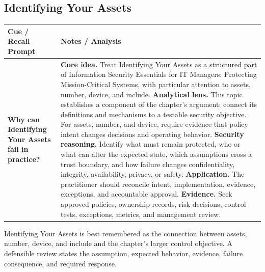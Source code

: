 \documentclass[11pt]{article}
\newcommand{\CornellHeader}{%
\rowcolor{Navy}\color{white}\bfseries Cue / Recall Prompt & \color{white}\bfseries Notes / Analysis\\\hline}
\newcommand{\CornellRow}[2]{%
\cellcolor{CueGray}\RaggedRight\textbf{#1} & \RaggedRight #2\\\hline}
\begin{document}
\subsection*{Identifying Your Assets}
\begin{longtable}{>{\RaggedRight\arraybackslash}p{}|>{\RaggedRight\arraybackslash}p{}}
\CornellHeader
\CornellRow{Why can Identifying Your Assets fail in practice?}{\textbf{Core idea.} Treat Identifying Your Assets as a structured part of Information Security Essentials for IT Managers: Protecting Mission-Critical Systems, with particular attention to assets, number, device, and include. \textbf{Analytical lens.} This topic establishes a component of the chapter's argument; connect its definitions and mechanisms to a testable security objective. For assets, number, and device, require evidence that policy intent changes decisions and operating behavior. \textbf{Security reasoning.} Identify what must remain protected, who or what can alter the expected state, which assumptions cross a trust boundary, and how failure changes confidentiality, integrity, availability, privacy, or safety. \textbf{Application.} The practitioner should reconcile intent, implementation, evidence, exceptions, and accountable approval. \textbf{Evidence.} Seek approved policies, ownership records, risk decisions, control tests, exceptions, metrics, and management review.}
\end{longtable}
\begin{topicsummary}
Identifying Your Assets is best remembered as the connection between assets, number, device, and include and the chapter's larger control objective. A defensible review states the assumption, expected behavior, evidence, failure consequence, and required response.
\end{topicsummary}
\end{document}
